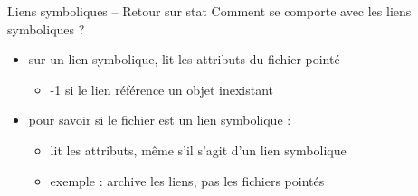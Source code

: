 \begin {frame} {Liens symboliques -- Retour sur stat}
    Comment se comporte  avec les liens symboliques ?

    \begin {itemize}
	\item sur un lien symbolique,  lit les attributs du
	    fichier pointé

	    \begin {itemize}
		\item -1 si le lien référence un objet inexistant
	    \end {itemize}

	\item pour savoir si le fichier est un lien symbolique :


	    \begin {itemize}
		\item {} lit les attributs, même
		    s'il s'agit d'un lien symbolique

		\item exemple :  archive les liens, pas les
		    fichiers pointés

	    \end {itemize}

    \end {itemize}
\end {frame}
